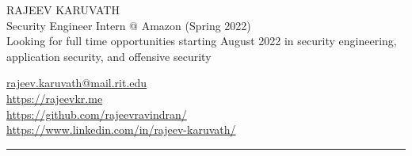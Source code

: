 \documentclass[letterpaper]{deedy-resume} %
\begin{document}

\begin{minipage}[t]{0.50\textwidth}

\begin{flushleft}
\Huge{}\uppercase{Rajeev Karuvath} \\
\sectionspace
\small{Security Engineer Intern @ Amazon (Spring 2022)} \\
\sectionspace
{}\scriptsize{Looking for full time opportunities starting August 2022 in security engineering, application security, and offensive security}
\end{flushleft}

\end{minipage}
\begin{minipage}[t]{0.40\textwidth}
\begin{flushright}
\small
\href{mailto:rk3824@rit.edu}{rajeev.karuvath@mail.rit.edu}  \faEnvelope \\
\url{https://rajeevkr.me}  \faChrome \\
\url{https://github.com/rajeevravindran/}  \faGithub  \\
\url{https://www.linkedin.com/in/rajeev-karuvath/}  \faLinkedin  \\

\end{flushright}
\end{minipage}
\sectionspace
\begin{hline}
\noindent\rule{\textwidth}{1pt}
\end{hline}

\end{document}
